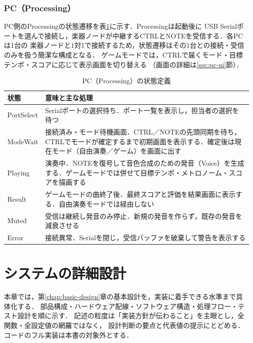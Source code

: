 \documentclass[lualatex,book,paper=a4paper,jafontsize=11.5pt,jafontscale=1.05]{jlreq}
\begin{document}
\subsection{PC（Processing）}
PC側のProcessingの状態遷移を表\ref{tab:state-pc}に示す．Processingは起動後に
USB Serialポートを選んで接続し，楽器ノードが中継するCTRLとNOTEを受信する．各PCは1台の
楽器ノードと1対1で接続するため，状態遷移はその1台との接続・受信のみを扱う簡潔な構成となる．
ゲームモードでは，CTRLで届くモード・目標テンポ・スコアに応じて表示画面を切り替える
（画面の詳細は\ref{sec:pc-ui}節）．
\begin{table}[H]\centering
  \caption{PC（Processing）の状態定義}\label{tab:state-pc}
  \small
  \begin{tabularx}{\linewidth}{>{\raggedright\arraybackslash}p{2.6cm} X}
    \toprule
    状態 & 意味と主な処理 \\
    \midrule
    PortSelect & Serialポートの選択待ち．ポート一覧を表示し，担当者の選択を待つ \\
    ModeWait & 接続済み・モード待機画面．CTRL／NOTEの先頭同期を待ち，CTRLでモードが確定するまで初期画面を表示する．確定後は現在モード（自由演奏／ゲーム）を画面に出す \\
    Playing & 演奏中．NOTEを復号して音色合成のための発音（Voice）を生成する．ゲームモードでは併せて目標テンポ・メトロノーム・スコアを描画する \\
    Result & ゲームモードの曲終了後．最終スコアと評価を結果画面に表示する．自由演奏モードでは経由しない \\
    Muted & 受信は継続し発音のみ停止．新規の発音を作らず，既存の発音を減衰させる \\
    Error & 接続異常．Serialを閉じ，受信バッファを破棄して警告を表示する \\
    \bottomrule
  \end{tabularx}
\end{table}

\chapter{システムの詳細設計}\label{chap:detail-design}

本章では，第\ref{chap:basic-design}章の基本設計を，実装に着手できる水準まで具体化する．
部品構成・ハードウェア配線・ソフトウェア構造・処理フロー・テスト設計を順に示す．
記述の粒度は「実装方針が伝わること」を主眼とし，全関数・全設定値の網羅ではなく，
設計判断の要点と代表値の提示にとどめる．コードのフル実装は本書の対象外とする．
\end{document}
